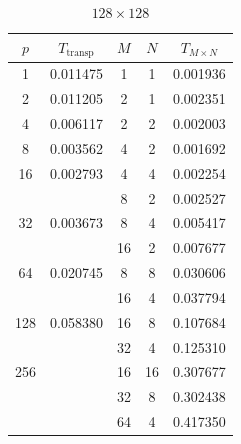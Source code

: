 \documentclass[a4paper,11pt]{article}
\begin{document}
\begin{minipage}{6.5cm}
\begin{table}[H]
\begin{tabular}{|cc|ccc|}
\hline
$p$ & $T_\text{transp}$ & $M$ & $N$ & $ T_{M \times N}$ \\ \hline
1 & 0.011475 & 1 & 1 & 0.001936 \\ \hline
2 & 0.011205 & 2 & 1 & 0.002351 \\ \hline
4 & 0.006117 & 2 & 2 & 0.002003 \\ \hline
8 & 0.003562 & 4 & 2 & 0.001692 \\ \hline
16 & 0.002793 & 4 & 4 & 0.002254 \\
 & & 8 & 2 & 0.002527 \\ \hline
32 & 0.003673 & 8 & 4 & 0.005417 \\
& & 16 & 2 & 0.007677 \\ \hline
64 & 0.020745 & 8 & 8 & 0.030606 \\
& & 16 & 4 & 0.037794 \\ \hline
128 & 0.058380 & 16 & 8 & 0.107684 \\
& & 32 & 4 & 0.125310 \\ \hline
256 & & 16 & 16 & 0.307677 \\
& & 32 & 8 & 0.302438 \\
& & 64 & 4 & 0.417350 \\ \hline
\end{tabular}
\caption{$128 \times 128$}\label{tab:128}
\end{table}
\end{minipage}
\end{document}
